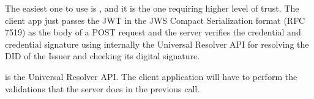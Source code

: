 \documentclass[a4paper,12pt,english,openany]{sphinxmanual}
\begin{document}
\sphinxAtStartPar
The easiest one to use is , and it is the one requiring higher level of trust. The client app just passes the JWT in the JWS Compact Serialization format (RFC 7519) as the body of a POST request and the server verifies the credential and credential signature using internally the Universal Resolver API for resolving the DID of the Issuer and checking its digital signature.

\sphinxAtStartPar
{} is the Universal Resolver API. The client application will have to perform the validations that the server does in the previous call.



\renewcommand{\indexname}{Index}
\printindex
\end{document}
